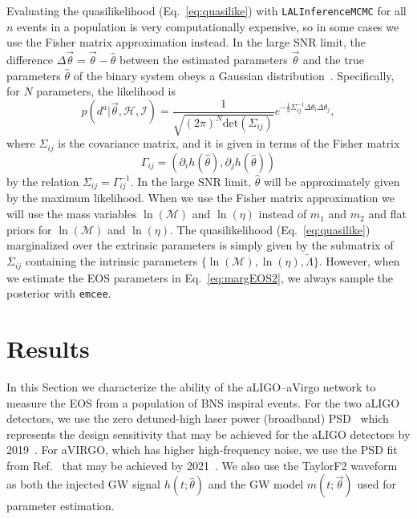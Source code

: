 \documentclass[twocolumn,prd,amssymb,aps,nofootinbib,showpacs,epsf]{revtex4}
\begin{document}
Evaluating the quasilikelihood (Eq.~\eqref{eq:quasilike}) with \texttt{LALInferenceMCMC} for all $n$ events in a population is very computationally expensive, so in some cases we use the Fisher matrix approximation instead. In the large SNR limit, the difference $\Delta\vec\theta = \vec\theta - \hat\theta$ between the estimated parameters $\vec\theta$ and the true parameters $\hat\theta$ of the binary system obeys a Gaussian distribution~\cite{FinnChernoff1993}. Specifically, for $N$ parameters, the likelihood is
\begin{equation}
\label{eq:gaussianlike}
p(d^a | \vec\theta,\mathcal{H},\mathcal{I}) = \frac{1}{\sqrt{(2\pi)^N \mathrm{det}(\Sigma_{ij})}} e^{-\frac{1}{2} \Sigma^{-1}_{ij} \Delta\theta_i \Delta\theta_j},
\end{equation}
where $\Sigma_{ij}$ is the covariance matrix, and it is given in terms of the Fisher matrix
\begin{equation}
\Gamma_{ij} = (\partial_i h(\hat\theta), \partial_j h(\hat\theta))
\end{equation}
by the relation $\Sigma_{ij}  = \Gamma^{-1}_{ij}$. In the large SNR limit, $\hat\theta$ will be approximately given by the maximum likelihood. When we use the Fisher matrix approximation we will use the mass variables $\ln(\mathcal{M})$ and $\ln(\eta)$ instead of $m_1$ and $m_2$ and flat priors for $\ln(\mathcal{M})$ and $\ln(\eta)$. The quasilikelihood (Eq.~\eqref{eq:quasilike}) marginalized over the extrinsic parameters is simply given by the submatrix of $\Sigma_{ij}$ containing the intrinsic parameters $\{\ln(\mathcal{M}), \ln(\eta), \tilde\Lambda\}$. However, when we estimate the EOS parameters in Eq.~\eqref{eq:margEOS2}, we always sample the posterior with \texttt{emcee}.


\section{Results}
\label{sec:results}

In this Section we characterize the ability of the aLIGO--aVirgo network to measure the EOS from a population of BNS inspiral events. For the two aLIGO detectors, we use the zero detuned-high laser power (broadband) PSD~\cite{LIGOnoise} which represents the design sensitivity that may be achieved for the aLIGO detectors by 2019~\cite{AasiAbadieAbbott2013}. For aVIRGO, which has higher high-frequency noise, we use the PSD fit from Ref.~\cite{ManzottiDietz2012} that may be achieved by 2021~\cite{AasiAbadieAbbott2013}. We also use the TaylorF2 waveform as both the injected GW signal $h(t; \hat\theta)$ and the GW model $m(t; \vec\theta)$ used for parameter estimation.
\end{document}
